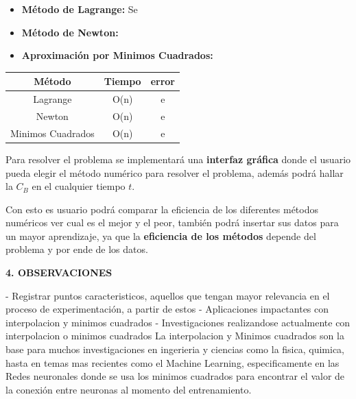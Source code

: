 \documentclass[10pt,a4paper]{article}
\begin{document}
\begin{multicols}{2}
		\vspace*{0.2cm}
		\begin{itemize}
			\item \textbf{Método de Lagrange: } Se
			\item \textbf{Método de Newton: }
			\item \textbf{Aproximación por Minimos Cuadrados:}
		\end{itemize}
		
		\begin{center}
			\renewcommand{\tabcolsep}{10pt}
			\begin{tabular}{ |c|c|c| }
				\hline
				Método            & Tiempo & error  \\ \hline
				Lagrange          & O(n)                & e                      \\ \hline
				Newton            & O(n)                & e                      \\ \hline
				Minimos Cuadrados & O(n)                & e                      \\ \hline \end{tabular}
		\end{center}
		
		
		\noindent Para resolver el problema se implementará una \textbf{interfaz gráfica} donde el usuario pueda elegir el método numérico para resolver el problema, además podrá hallar la $C_B$ en el cualquier tiempo $t$.  
		
		\noindent Con esto es usuario podrá comparar la eficiencia de los diferentes métodos numéricos ver cual es el mejor y el peor, también podrá insertar sus datos para un mayor aprendizaje, ya que la \textbf{eficiencia de los métodos} depende del problema y por ende de los datos.
		
		\begin{center}
			{\large \bf 4. OBSERVACIONES}
		\end{center}
		
		- Registrar puntos caracteristicos, aquellos que tengan mayor relevancia en el proceso de experimentación, a partir de estos 
		- Aplicaciones impactantes con interpolacion y minimos cuadrados 
		- Investigaciones realizandose actualmente con interpolacion o minimos cuadrados
		La interpolacion y Minimos cuadrados son la base para muchos investigaciones en ingerieria y ciencias como la fisica, quimica, hasta en temas mas recientes como el Machine Learning, especificamente en las Redes neuronales donde se usa los minimos cuadrados para encontrar el valor de la conexión entre neuronas al momento del entrenamiento.
		

\end{multicols}
\end{document}
